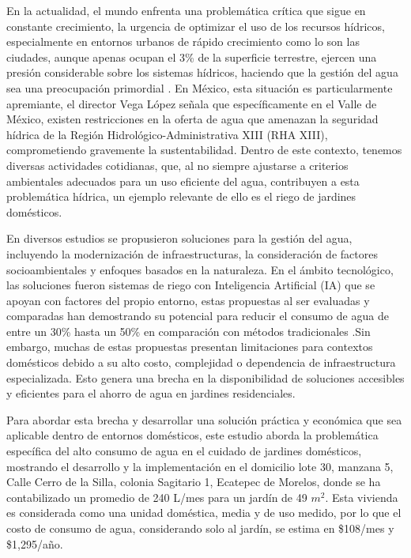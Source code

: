 \documentclass[pdflatex,sn-mathphys-num]{sn-jnl}%
\theoremstyle{thmstyleone}%
\theoremstyle{thmstyletwo}%
\theoremstyle{thmstylethree}%
\begin{document}
\begin{multicols}{2}
\justifying
En la actualidad, el mundo enfrenta una problemática crítica que sigue en constante crecimiento, la urgencia de optimizar el uso de los recursos hídricos, especialmente en entornos urbanos de rápido crecimiento como lo son las ciudades, aunque apenas ocupan el 3\% de la superficie terrestre, ejercen una presión considerable sobre los sistemas hídricos, haciendo que la gestión del agua sea una preocupación primordial \cite{ref1}. En México, esta situación es particularmente apremiante, el director Vega López señala que específicamente en el Valle de México, existen restricciones en la oferta de agua que amenazan la seguridad hídrica de la Región Hidrológico-Administrativa XIII (RHA XIII), comprometiendo gravemente la sustentabilidad\cite{ref2}. Dentro de este contexto, tenemos diversas actividades cotidianas, que, al no siempre ajustarse a criterios ambientales adecuados para un uso eficiente del agua, contribuyen a esta problemática hídrica, un ejemplo relevante de ello es el riego de jardines domésticos.

En diversos estudios se propusieron soluciones para la gestión del agua, incluyendo la modernización de infraestructuras, la consideración de factores socioambientales y enfoques basados en la naturaleza. En el ámbito tecnológico, las soluciones fueron sistemas de riego con Inteligencia Artificial (IA) que se apoyan con factores del propio entorno, estas propuestas al ser evaluadas y comparadas han demostrando su potencial para reducir el consumo de agua de entre un 30\% hasta un 50\% en comparación con métodos tradicionales \cite{ref3}.Sin embargo, muchas de estas propuestas presentan limitaciones para contextos domésticos debido a su alto costo, complejidad o dependencia de infraestructura especializada. Esto genera una brecha en la disponibilidad de soluciones accesibles y eficientes para el ahorro de agua en jardines residenciales.

Para abordar esta brecha y desarrollar una solución práctica y económica que sea aplicable dentro de entornos domésticos, este estudio aborda la problemática específica del alto consumo de agua en el cuidado de jardines domésticos, mostrando el desarrollo y la implementación en el domicilio lote 30, manzana 5, Calle Cerro de la Silla, colonia Sagitario 1, Ecatepec de Morelos, donde se ha contabilizado un promedio de 240 L/mes para un jardín de 49 $m^2$. Esta vivienda es considerada como una unidad doméstica, media y de uso medido, por lo que el costo de consumo de agua, considerando solo al jardín, se estima en \$108/mes y \$1,295/año\cite{ref4}.


\end{multicols}
\end{document}
